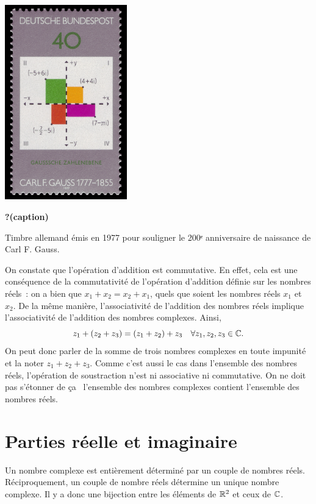 \documentclass[
  letterpaper,
  DIV=11,
  numbers=noendperiod,
  oneside]{scrreprt}
\theoremstyle{definition}
\theoremstyle{remark}
\begin{document}
\begin{marginfigure}

{\centering \includegraphics[width=2.08333in,height=\textheight]{images/timbre.jpg}

}

\caption{\label{fig-timbre}\textbf{?(caption)}}

\end{marginfigure}

Timbre allemand émis en 1977 pour souligner le 200ᵉ anniversaire de
naissance de Carl F. Gauss.

On constate que l'opération d'addition est commutative. En effet, cela
est une conséquence de la commutativité de l'opération d'addition
définie sur les nombres réels~: on a bien que \(x_1+x_2=x_2+x_1\), quels
que soient les nombres réels \(x_1\) et \(x_2\). De la même manière,
l'associativité de l'addition des nombres réels implique l'associativité
de l'addition des nombres complexes. Ainsi,
\[z_1+(z_2+z_3)=(z_1+z_2)+z_3\quad\forall z_1,z_2,z_3\in\mathbb{C}.\] On peut
donc parler de la somme de trois nombres complexes en toute impunité et
la noter \(z_1+z_2+z_3\). Comme c'est aussi le cas dans l'ensemble des
nombres réels, l'opération de soustraction n'est ni associative ni
commutative. On ne doit pas s'étonner de ça~ l'ensemble des nombres
complexes contient l'ensemble des nombres réels.

\hypertarget{parties-ruxe9elle-et-imaginaire}{%
\section{Parties réelle et
imaginaire}\label{parties-ruxe9elle-et-imaginaire}}

Un nombre complexe est entièrement déterminé par un couple de nombres
réels. Réciproquement, un couple de nombre réels détermine un unique
nombre complexe. Il y a donc une bijection entre les éléments de
\(\mathbb{R}^2\) et ceux de \(\mathbb{C}\).
\end{document}
